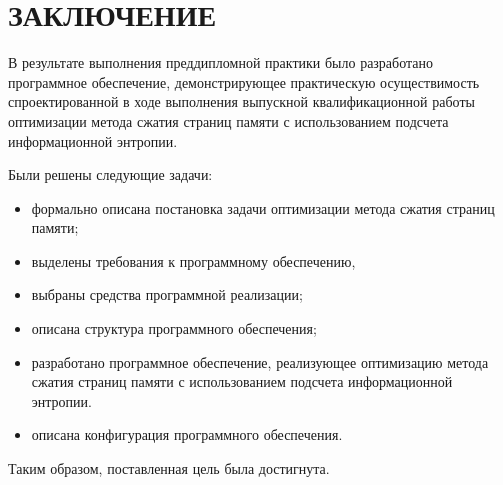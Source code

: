 \chapter*{ЗАКЛЮЧЕНИЕ}

В результате выполнения преддипломной практики было разработано программное обеспечение, демонстрирующее практическую осуществимость спроектированной в ходе выполнения выпускной квалификационной работы оптимизации метода сжатия страниц памяти с использованием подсчета информационной энтропии.

Были решены следующие задачи:

\begin{itemize}
	\item формально описана постановка задачи оптимизации метода сжатия страниц памяти;
	\item выделены требования к программному обеспечению, 
	\item выбраны средства программной реализации;
    \item описана структура программного обеспечения;
    \item разработано программное обеспечение, реализующее оптимизацию метода сжатия страниц памяти с использованием подсчета информационной энтропии.
	\item описана конфигурация программного обеспечения.
\end{itemize}

Таким образом, поставленная цель была достигнута.